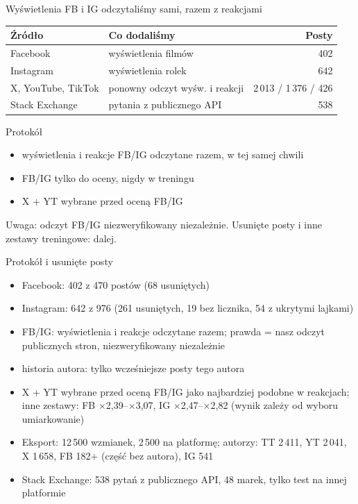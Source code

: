 \documentclass[aspectratio=169,10pt]{beamer}
\renewcommand{\x}[1]{$\times$#1}
\begin{document}
\begin{frame}{Wyświetlenia FB i IG odczytaliśmy sami, razem z reakcjami}
\centering\small\setlength{\tabcolsep}{6pt}\renewcommand{\arraystretch}{1.25}
\begin{tabular}{llr}
\toprule
Źródło & Co dodaliśmy & Posty \\
\midrule
Facebook & wyświetlenia filmów & 402 \\
Instagram & wyświetlenia rolek & 642 \\
X, YouTube, TikTok & ponowny odczyt wyśw. i reakcji & 2\,013 / 1\,376 / 426 \\
Stack Exchange & pytania z publicznego API & 538 \\
\bottomrule
\end{tabular}
\vspace{6pt}
\begin{block}{Protokół}
\small
\begin{itemize}\setlength\itemsep{2pt}
\item wyświetlenia i reakcje FB/IG odczytane \alert{razem, w tej samej chwili}
\item FB/IG tylko do oceny, nigdy w treningu
\item X + YT wybrane \alert{przed} oceną FB/IG
\end{itemize}
\end{block}
\vfill
{\scriptsize\color{mut} Uwaga: odczyt FB/IG niezweryfikowany niezależnie. Usunięte posty i inne zestawy treningowe: dalej.}
\end{frame}

\begin{frame}{Protokół i usunięte posty}
\small
\begin{itemize}\setlength\itemsep{4pt}
\item Facebook: 402 z 470 postów (68 usuniętych)
\item Instagram: 642 z 976 (261 usuniętych, 19 bez licznika, 54 z ukrytymi lajkami)
\item FB/IG: wyświetlenia i reakcje odczytane razem; prawda = nasz odczyt publicznych stron, niezweryfikowany niezależnie
\item historia autora: tylko \alert{wcześniejsze} posty tego autora
\item X + YT wybrane przed oceną FB/IG jako najbardziej podobne w reakcjach; inne zestawy: FB \x{2,39}--\x{3,07}, IG \x{2,47}--\x{2,82} (wynik zależy od wyboru umiarkowanie)
\item Eksport: 12\,500 wzmianek, 2\,500 na platformę; autorzy: TT 2\,411, YT 2\,041, X 1\,658, FB 182+ (część bez autora), IG 541
\item Stack Exchange: 538 pytań z publicznego API, 48 marek, tylko test na innej platformie
\end{itemize}
\end{frame}
\end{document}
